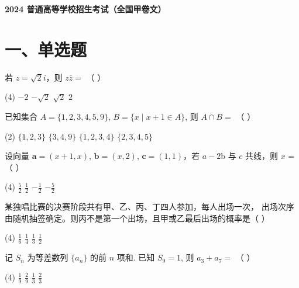 \documentclass[UTF8,12pt]{ctexart}
\newcommand{\examtitle}{2024 普通高等学校招生考试（全国甲卷文）}
\newcommand{\examsubtitle}{普通高等学校招生考试（全国甲卷文）}
\newcommand{\makeexamtitle}{%
  \begin{center}
    {\LARGE\bfseries\examtitle}\par
    \vspace{0.4em}{\Large\bfseries\examsubtitle}\par
  \end{center}\vspace{0.4em}}
\begin{document}
\makeexamtitle

\section*{一、单选题}

\begin{questions}

  \item 若 $z = \sqrt{2}i$，则 $z\overline{z} =$ （ ）

    \begin{tasks}(4)
      \task $-2$
      \task $-\sqrt{2}$
      \task $\sqrt{2}$
      \task $2$
    \end{tasks}

  \item 已知集合 $A = \{1, 2, 3, 4, 5, 9\}$, $B = \{x \mid x + 1 \in A\}$, 则
    $A \cap B =$ （ ）

    \begin{tasks}(2)
      \task $\{1, 2, 3\}$
      \task $\{3, 4, 9\}$
      \task $\{1, 2, 3, 4\}$
      \task $\{2, 3, 4, 5\}$
    \end{tasks}

  \item 设向量 $\boldsymbol{a} = (x + 1, x)$, $\boldsymbol{b} = (x, 2)$,
    $\boldsymbol{c} = (1, 1)$，若 $a - 2$b 与 $c$ 共线，则 $x$ = （ ）

    \begin{tasks}(4)
      \task $\frac{5}{2}$
      \task $\frac{1}{2}$
      \task $-\frac{1}{2}$
      \task $-\frac{5}{2}$
    \end{tasks}

  \item 某独唱比赛的决赛阶段共有甲、乙、丙、丁四人参加，每人出场一次，
    出场次序由随机抽签确定。则丙不是第一个出场，且甲或乙最后出场的概率是（ ）

    \begin{tasks}(4)
      \task $\frac{1}{6}$
      \task $\frac{1}{4}$
      \task $\frac{1}{3}$
      \task $\frac{1}{2}$
    \end{tasks}

  \item 记 $S_{n}$ 为等差数列 $\{a_{n}\}$ 的前 $n$ 项和. 已知 $S_{9}=1$, 则
    $a_{3}+a_{7}=$ （ ）

    \begin{tasks}(4)
      \task $\frac{1}{9}$
      \task $\frac{2}{9}$
      \task $\frac{1}{3}$
      \task $\frac{2}{3}$
    \end{tasks}


\end{questions}
\end{document}
